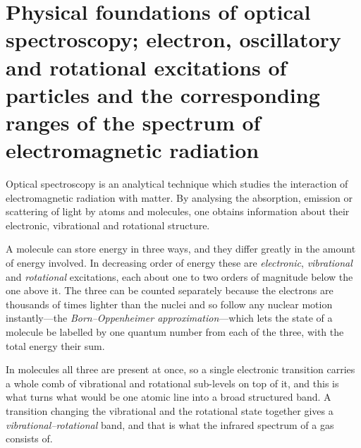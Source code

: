 \cleardoublepage
{}

\section{Physical foundations of optical spectroscopy; electron, oscillatory and rotational excitations of particles and the corresponding ranges of the spectrum of electromagnetic radiation}
\label{sec:spectroscopy}
 
    Optical spectroscopy is an analytical technique which studies the interaction of electromagnetic radiation with matter. By analysing the absorption, emission or scattering of light by atoms and molecules, one obtains information about their electronic, vibrational and rotational structure.
 
    A molecule can store energy in three ways, and they differ greatly in the amount of energy involved. In decreasing order of energy these are \emph{electronic}, \emph{vibrational} and \emph{rotational} excitations, each about one to two orders of magnitude below the one above it. The three can be counted separately because the electrons are thousands of times lighter than the nuclei and so follow any nuclear motion instantly---the \emph{Born--Oppenheimer approximation}---which lets the state of a molecule be labelled by one quantum number from each of the three, with the total energy their sum.
 
    In molecules all three are present at once, so a single electronic transition carries a whole comb of vibrational and rotational sub-levels on top of it, and this is what turns what would be one atomic line into a broad structured band. A transition changing the vibrational and the rotational state together gives a \emph{vibrational--rotational} band, and that is what the infrared spectrum of a gas consists of.
 
